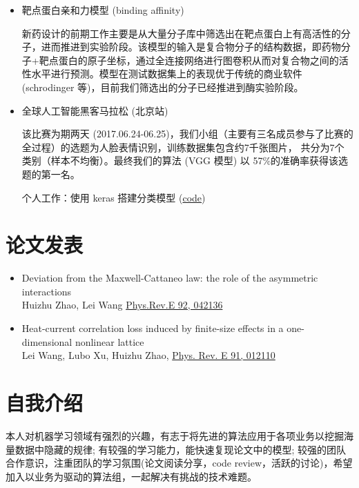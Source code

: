 \documentclass[letterpaper,11pt]{article}
\begin{document}
\begin{itemize}



\item 靶点蛋白亲和力模型 (binding affinity)

新药设计的前期工作主要是从大量分子库中筛选出在靶点蛋白上有高活性的分子，进而推进到实验阶段。该模型的输入是复合物分子的结构数据，即药物分子+靶点蛋白的原子坐标，通过全连接网络进行图卷积从而对复合物之间的活性水平进行预测。模型在测试数据集上的表现优于传统的商业软件(schrodinger 等)，目前我们筛选出的分子已经推进到酶实验阶段。

\item 全球人工智能黑客马拉松 (北京站)

该比赛为期两天 (2017.06.24-06.25)，我们小组（主要有三名成员参与了比赛的全过程）的选题为人脸表情识别，训练数据集包含约7千张图片，
共分为7个类别（样本不均衡）。最终我们的算法 (VGG 模型) 以 57\%的准确率获得该选题的第一名。

个人工作：使用 keras 搭建分类模型 (\href{https://github.com/huizhuzhao/Hackthon}{code})

\end{itemize}

\section{论文发表}

\begin{itemize}
\item Deviation from the Maxwell-Cattaneo law: the role of the asymmetric interactions \\
Huizhu Zhao, Lei Wang \href{https://journals.aps.org/pre/abstract/10.1103/PhysRevE.92.042136}{Phys.Rev.E 92, 042136}
\item Heat-current correlation loss induced by finite-size effects in a one-dimensional nonlinear lattice \\
Lei Wang, Lubo Xu, Huizhu Zhao, \href{https://journals.aps.org/pre/abstract/10.1103/PhysRevE.91.012110}{Phys. Rev. E 91, 012110}
\end{itemize}


\section{自我介绍}

本人对机器学习领域有强烈的兴趣，有志于将先进的算法应用于各项业务以挖掘海量数据中隐藏的规律;
有较强的学习能力，能快速复现论文中的模型;
较强的团队合作意识，注重团队的学习氛围(论文阅读分享，code review，活跃的讨论)，希望加入以业务为驱动的算法组，一起解决有挑战的技术难题。
\end{document}
